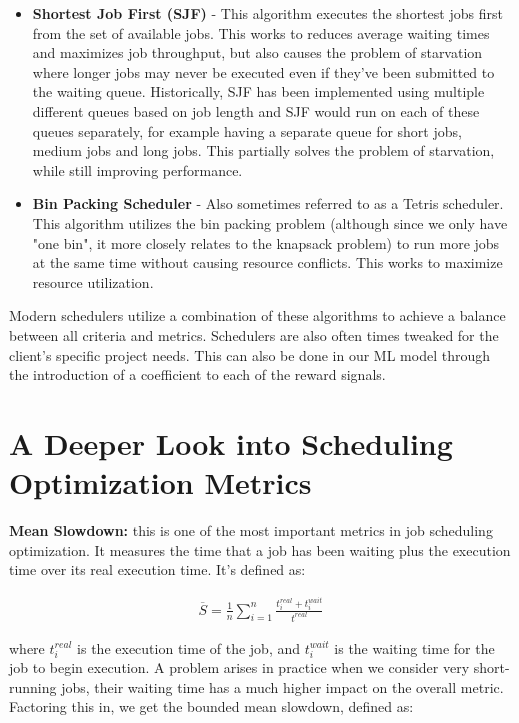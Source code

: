 \documentclass{article}
\begin{document}
\begin{spacing}{2.0}
\begin{itemize}
    \item \textbf{Shortest Job First (SJF)} - This algorithm executes the shortest jobs first from the set of available jobs. This works to reduces average waiting
    times and maximizes job throughput, but also causes the problem of starvation where longer jobs may never be executed even if they've been submitted to the
    waiting queue. Historically, SJF has been implemented using multiple different queues based on job length and SJF would run on each of these queues separately,
    for example having a separate queue for short jobs, medium jobs and long jobs. This partially solves the problem of starvation, while still improving performance.

    \item \textbf{Bin Packing Scheduler} - Also sometimes referred to as a Tetris scheduler. This algorithm utilizes the bin packing problem (although since we
    only have "one bin", it more closely relates to the knapsack problem) to run more jobs at the same time without causing resource conflicts. This works to
    maximize resource utilization.
\end{itemize}

Modern schedulers utilize a combination of these algorithms to achieve a balance between all criteria and metrics. Schedulers are also often times tweaked for
the client's specific project needs. This can also be done in our ML model through the introduction of a coefficient to each of the reward signals.

\newpage
\section{A Deeper Look into Scheduling Optimization Metrics}

\textbf{Mean Slowdown:} this is one of the most important metrics in job scheduling optimization. It measures the time that a job has been waiting plus the execution time over its real execution time. It's defined as:

\begin{gather*}
    \overline{S} = \frac{1}{n} \sum_{i = 1}^{n} \frac{t^{real}_{i} + t^{wait}_{i}}{t^{real}}
\end{gather*}

where $t^{real}_{i}$ is the execution time of the job, and $t^{wait}_{i}$ is the waiting time for the job to begin execution. A problem arises in practice when we consider very short-running jobs, their waiting time has a much higher impact on the overall metric. Factoring this in, we get the bounded mean slowdown, defined as:


\end{spacing}
\end{document}
